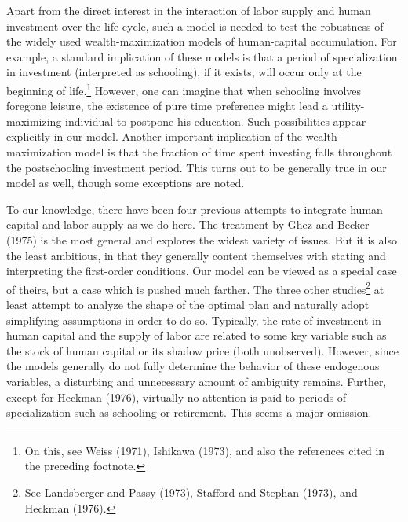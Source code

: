 \documentclass[11pt,fleqn]{article}
\begin{document}
Apart from the direct interest in the interaction of labor supply and human investment over the life cycle, such a model is needed to test the robustness of the widely used wealth-maximization models of human-capital accumulation. For example, a standard implication of these models is that a period of specialization in investment (interpreted as schooling), if it exists, will occur only at the beginning of life.\footnote{On this, see Weiss (1971), Ishikawa (1973), and also the references cited in the preceding footnote.} However, one can imagine that when schooling involves foregone leisure, the existence of pure time preference might lead a utility-maximizing individual to postpone his education. Such possibilities appear explicitly in our model. Another important implication of the wealth-maximization model is that the fraction of time spent investing falls throughout the postschooling investment period. This turns out to be generally true in our model as well, though some exceptions are noted.

To our knowledge, there have been four previous attempts to integrate human capital and labor supply as we do here. The treatment by Ghez and Becker (1975) is the most general and explores the widest variety of issues. But it is also the least ambitious, in that they generally content themselves with stating and interpreting the first-order conditions. Our model can be viewed as a special case of theirs, but a case which is pushed much farther. The three other studies\footnote{See Landsberger and Passy (1973), Stafford and Stephan (1973), and Heckman (1976).} at least attempt to analyze the shape of the optimal plan and naturally adopt simplifying assumptions in order to do so. Typically, the rate of investment in human capital and the supply of labor are related to some key variable such as the stock of human capital or its shadow price (both unobserved). However, since the models generally do not fully determine the behavior of these endogenous variables, a disturbing and unnecessary amount of ambiguity remains. Further, except for Heckman (1976), virtually no attention is paid to periods of specialization such as schooling or retirement. This seems a major omission.
\end{document}
